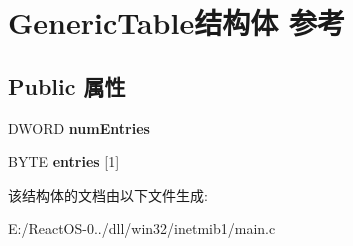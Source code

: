 \hypertarget{struct_generic_table}{}\section{Generic\+Table结构体 参考}
\label{struct_generic_table}
\subsection*{Public 属性}
\begin{DoxyCompactItemize}
\item 
\mbox{\label{struct_generic_table_a262e185cc45a4b1b87311e7d447cd2f5}} 
D\+W\+O\+RD {\bfseries num\+Entries}
\item 
\mbox{\label{struct_generic_table_a81b756b66d980e68af3fd00e90fe4011}} 
B\+Y\+TE {\bfseries entries} \mbox{[}1\mbox{]}
\end{DoxyCompactItemize}


该结构体的文档由以下文件生成\+:\begin{DoxyCompactItemize}
\item 
E\+:/\+React\+O\+S-\/0../dll/win32/inetmib1/main.\+c\end{DoxyCompactItemize}
